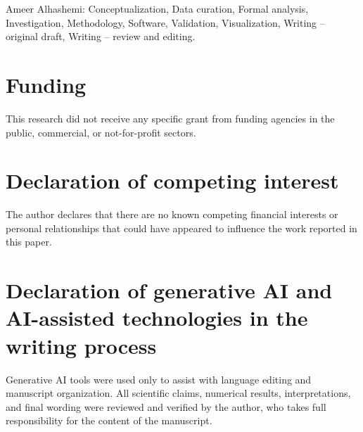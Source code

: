 \documentclass[preprint,12pt]{elsarticle}
\begin{document}
Ameer Alhashemi: Conceptualization, Data curation, Formal analysis, Investigation, Methodology, Software, Validation, Visualization, Writing -- original draft, Writing -- review and editing.

\section*{Funding}

This research did not receive any specific grant from funding agencies in the public, commercial, or not-for-profit sectors.

\section*{Declaration of competing interest}

The author declares that there are no known competing financial interests or personal relationships that could have appeared to influence the work reported in this paper.

\section*{Declaration of generative AI and AI-assisted technologies in the writing process}

Generative AI tools were used only to assist with language editing and manuscript organization. All scientific claims, numerical results, interpretations, and final wording were reviewed and verified by the author, who takes full responsibility for the content of the manuscript.

\ifuseelsarticle

\else

\fi

\end{document}
